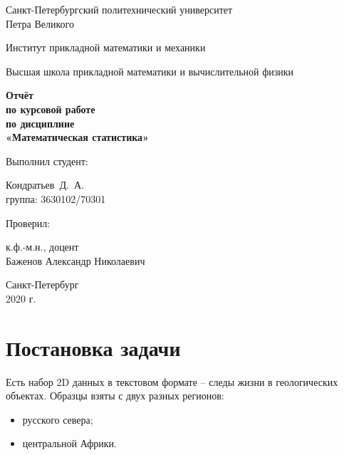 \documentclass[12pt,a4paper]{article}
\begin{document}
	\begin{titlepage}
		\begin{center}			
			Санкт-Петербургский политехнический университет\\
			Петра Великого
			\vspace{0.25cm}
			
			Институт прикладной математики и механики
			
			Высшая школа прикладной математики и вычислительной физики
			\vfill
			
			\textbf{Отчёт\\
				по курсовой работе\\
				по дисциплине\\
				«Математическая статистика»}\\[5mm]
			\bigskip
		\end{center}
		\vfill
		
		\hfill\begin{minipage}{0.45\textwidth}
			Выполнил студент:
			\vspace{0.2cm}
			
			Кондратьев~Д.~А.\\
			группа: 3630102/70301
		\end{minipage}%
		\bigskip
		
		\hfill\begin{minipage}{0.45\textwidth}
			Проверил:
			\vspace{0.2cm}
			
			к.ф.-м.н., доцент\\
			Баженов Александр Николаевич
		\end{minipage}%
		\vfill
		
		\begin{center}
			Санкт-Петербург\\
			2020 г.
		\end{center}
	\end{titlepage}
	
	
	
	\tableofcontents{}
	\listoftables
	\listoffigures
	
	\newpage
	\section{Постановка задачи}
		Есть набор 2D данных в текстовом формате – следы жизни в геологических
		объектах. Образцы взяты с двух разных регионов:
		\begin{itemize}
			\item русского севера;
			\item центральной Африки.
		\end{itemize}
	
\end{document}
